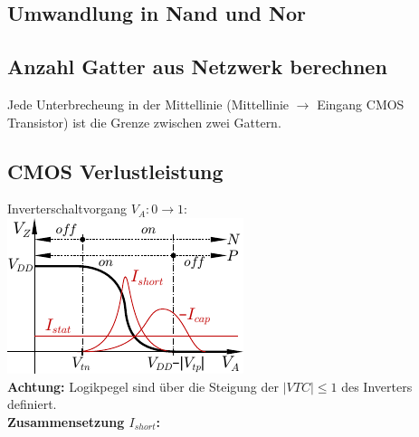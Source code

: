 \documentclass[6pt,a4paper]{scrartcl}
\renewcommand{\emph}[1]{\textsf{\textbf{#1}}}
\newcommand{\ra}[0]{\ensuremath{\rightarrow}} 									%
\begin{document}
\begin{multicols*}{3}
  \subsection{Umwandlung in Nand und Nor}
  \subsection{Anzahl Gatter aus Netzwerk berechnen}
  Jede Unterbrecheung in der Mittellinie (Mittellinie $\rightarrow$ Eingang CMOS Transistor) ist die Grenze zwischen zwei Gattern.
	\subsection{CMOS Verlustleistung}
	Inverterschaltvorgang $V_A: 0 \ra 1$:\\
	\includegraphics{./img/ds/char_inverter.pdf}\\
	\emph{Achtung:} Logikpegel sind über die Steigung der $|VTC|\le 1$ des Inverters definiert.\\
	\emph{Zusammensetzung $I_{short}$:}\\


\end{multicols*}
\end{document}
